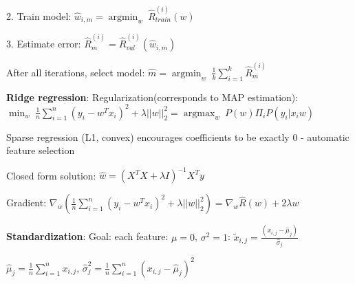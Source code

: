 2. Train model: $\hat{w}_{i,m} = \operatorname{argmin}_w\ \hat{R}_{train}^{(i)}(w)$

3. Estimate error: $\hat{R}_m^{(i)} =  \hat{R}_{val}^{(i)}(\hat{w}_{i,m})$

After all iterations, select model:  $\hat{m} =  \operatorname{argmin}_w\ \frac{1}{k} \sum_{i=1}^k \hat{R}_m^{(i)}$

\textbf{Ridge regression}: Regularization(corresponds to MAP estimation): $\operatorname{min}_w\ \frac{1}{n} \sum_{i=1}^n (y_i - w^Tx_i)^2 + \lambda ||w||_2^2 =  \operatorname{argmax}_w\ P(w)\Pi_i P(y_i | x_i w)$

Sparse regression (L1, convex) encourages coefficients to be exactly 0 - automatic feature selection

Closed form solution: $\hat{w} =(X^T X + \lambda I)^{-1} X^T y$

Gradient: $\nabla_w (\frac{1}{n} \sum_{i=1}^n (y_i - w^Tx_i)^2 + \lambda ||w||_2^2) = \nabla_w \hat{R}(w) + 2 \lambda w$

\textbf{Standardization}: Goal: each feature: $\mu = 0$, $\sigma^2 = 1$: $\tilde{x}_{i,j} = \frac{(x_{i,j}-\hat{\mu}_j)}{\hat{\sigma}_j}$

$\hat{\mu}_j = \frac{1}{n}\sum_{i=1}^n x_{i,j}$, $\hat{\sigma}_j^2 = \frac{1}{n}\sum_{i=1}^n {(x_{i,j}-\hat{\mu}_j)}^2$
